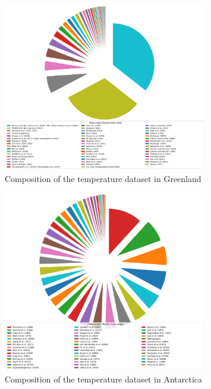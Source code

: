 \documentclass[journal abbreviation, manuscript]{copernicus}
\begin{document}
\begin{figure}[!htb]
\caption{Composition of the temperature dataset in Greenland}
\centering
\includegraphics[width=0.8\textwidth]{figures/temperature_dataset_composition_greenland.png}
\end{figure}


\begin{figure}[!htb]
\caption{Composition of the temperature dataset in Antarctica}
\centering
\includegraphics[width=0.8\textwidth]{figures/temperature_dataset_composition_antarctica.png}
\end{figure}

\end{document}
